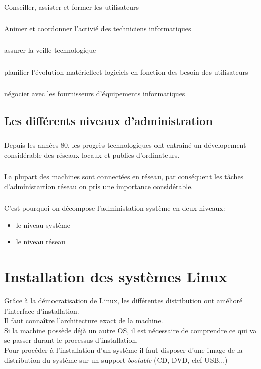 \documentclass[12pt,a4paper,openany]{book}
\begin{document}
	\paragraph{}
		Conseiller, assister et former les utilisateurs
	\paragraph{}
		Animer et coordonner l'activié des techniciens informatiques
	\paragraph{}
		assurer la veille technologique
	\paragraph{}
		planifier l'évolution matérielleet logiciels en fonction des besoin des utilisateurs
	\paragraph{}
		négocier avec les fournisseurs d'équipements informatiques
	\section{Les différents niveaux d'administration}
		\paragraph{}
			Depuis les années 80, les progrès technologiques ont entrainé un dévelopement 
			considérable des réseaux locaux et publics d'ordinateurs.
		\paragraph{}
			La plupart des machines sont connectées en réseau, par conséquent les 
			tâches d'administartion réseau on pris une importance considérable.
		\paragraph{}
			C'est pourquoi on décompose l'administation système en deux niveaux:
			\begin{itemize}
				\item le niveau système
				\item le niveau réseau
			\end{itemize}
	\chapter{Installation des systèmes Linux}
		Grâce à la démocratisation de Linux, les différentes distribution ont amélioré
		l'interface d'installation.\\
		Il faut connaître l'architecture exact de la machine.\\
		Si la machine possède déjà un autre OS, il est nécessaire de comprendre ce qui
		va se passer durant le processus d'installation.\\
		Pour procéder à l'installation d'un système il faut disposer d'une image de la
		distribution du système sur un support \textit{bootable} (CD, DVD, clef USB...)
\end{document}
